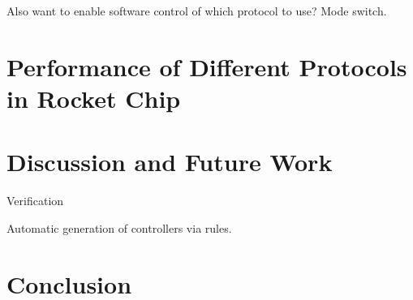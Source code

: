 Also want to enable software control of which protocol to use? Mode switch.

\section{Performance of Different Protocols in Rocket Chip}

\section{Discussion and Future Work}

Verification

Automatic generation of controllers via rules.

\section{Conclusion}
